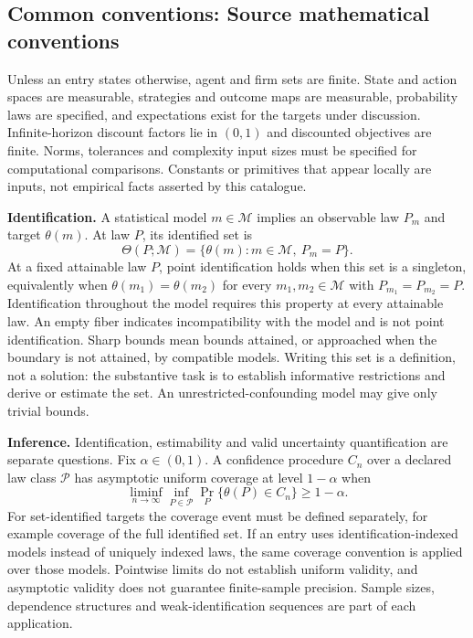 \documentclass[11pt,a4paper]{article}
\begin{document}
\subsection*{Common conventions: Source mathematical conventions}

Unless an entry states otherwise, agent and firm sets are finite. State and action spaces are measurable, strategies and outcome maps are measurable, probability laws are specified, and expectations exist for the targets under discussion. Infinite-horizon discount factors lie in $(0,1)$ and discounted objectives are finite. Norms, tolerances and complexity input sizes must be specified for computational comparisons. Constants or primitives that appear locally are inputs, not empirical facts asserted by this catalogue.

\textbf{Identification.} A statistical model $m\in\mathcal M$ implies an observable law $P_m$ and target $\theta(m)$. At law $P$, its identified set is
\[
\Theta(P;\mathcal M)=\{\theta(m):m\in\mathcal M,\ P_m=P\}.
\]
At a fixed attainable law $P$, point identification holds when this set is a singleton, equivalently when $\theta(m_1)=\theta(m_2)$ for every $m_1,m_2\in\mathcal M$ with $P_{m_1}=P_{m_2}=P$. Identification throughout the model requires this property at every attainable law. An empty fiber indicates incompatibility with the model and is not point identification. Sharp bounds mean bounds attained, or approached when the boundary is not attained, by compatible models. Writing this set is a definition, not a solution: the substantive task is to establish informative restrictions and derive or estimate the set. An unrestricted-confounding model may give only trivial bounds.

\textbf{Inference.} Identification, estimability and valid uncertainty quantification are separate questions. Fix $\alpha\in(0,1)$. A confidence procedure $C_n$ over a declared law class $\mathcal P$ has asymptotic uniform coverage at level $1-\alpha$ when
\[
\liminf_{n\to\infty}\inf_{P\in\mathcal P}\Pr_P\{\theta(P)\in C_n\}\geq1-\alpha.
\]
For set-identified targets the coverage event must be defined separately, for example coverage of the full identified set. If an entry uses identification-indexed models instead of uniquely indexed laws, the same coverage convention is applied over those models. Pointwise limits do not establish uniform validity, and asymptotic validity does not guarantee finite-sample precision. Sample sizes, dependence structures and weak-identification sequences are part of each application.
\end{document}
